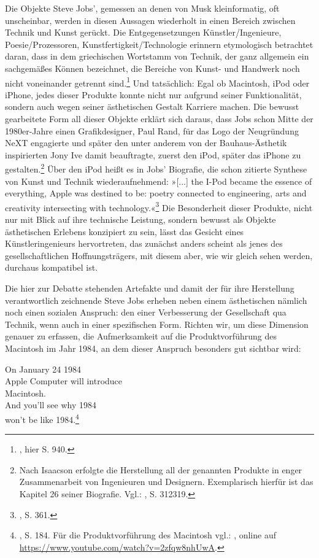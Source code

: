 \documentclass[%
	fontsize=10pt,%
	twoside,%
	headings=optiontoheadandtoc,%
	showtrims]{scrbook}
\renewenvironment{quote}{%
  \addmargin[\genericindent]{0pt}%
  \KOMAoptions{parskip=true}%
  \ifdim\parskip>0pt\else\addvspace{\intextsep}\fi
}{%
  \par
  \endaddmargin\vspace{\intextsep}
}
\begin{document}
\par Die Objekte Steve Jobs\textquoteright{}, gemessen an denen von Musk kleinformatig, oft unscheinbar, werden in diesen Aussagen wiederholt in einen Bereich zwischen Technik und Kunst gerückt. Die Entgegensetzungen Künstler/Ingenieure, Poesie/Prozessoren, Kunstfertigkeit/Technologie erinnern etymologisch betrachtet daran, dass in dem griechischen Wortstamm von Technik, der ganz allgemein ein sachgemäßes Können bezeichnet, die Bereiche von Kunst- und Handwerk noch nicht voneinander getrennt sind.\footnote{\cite[][]{technik1998a}, hier S. 940.}  Und tatsächlich: Egal ob Macintosh, iPod oder iPhone, jedes dieser Produkte konnte nicht nur aufgrund seiner Funktionalität, sondern auch wegen seiner ästhetischen Gestalt Karriere machen. Die bewusst gearbeitete Form all dieser Objekte erklärt sich daraus, dass Jobs schon Mitte der 1980er-Jahre einen Grafikdesigner, Paul Rand, für das Logo der Neugründung NeXT engagierte und später den unter anderem von der Bauhaus-Ästhetik inspirierten Jony Ive damit beauftragte, zuerst den iPod, später das iPhone zu gestalten.\footnote{Nach Isaacson erfolgte die Herstellung all der genannten Produkte in enger Zusammenarbeit von Ingenieuren und Designern. Exemplarisch hierfür ist das Kapitel 26 seiner Biografie. Vgl.: \cite[][]{isaacson2011a}, S. 312\textendash{}319.}  Über den iPod heißt es in Jobs\textquoteright{} Biografie, die schon zitierte Synthese von Kunst und Technik wiederaufnehmend: »{[}...{]} the I-Pod became the essence of everything, Apple was destined to be: poetry connected to engineering, arts and creativity intersecting with technology.«\footnote{\cite[][]{isaacson2011a}, S. 361.}  Die Besonderheit dieser Produkte, nicht nur mit Blick auf ihre technische Leistung, sondern bewusst als Objekte ästhetischen Erlebens konzipiert zu sein, lässt das Gesicht eines Künstleringenieurs hervortreten, das zunächst anders scheint als jenes des gesellschaftlichen Hoffnungsträgers, mit diesem aber, wie wir gleich sehen werden, durchaus kompatibel ist.\par Die hier zur Debatte stehenden Artefakte und damit der für ihre Herstellung verantwortlich zeichnende Steve Jobs erheben neben einem ästhetischen nämlich noch einen sozialen Anspruch: den einer Verbesserung der Gesellschaft qua Technik, wenn auch in einer spezifischen Form. Richten wir, um diese Dimension genauer zu erfassen, die Aufmerksamkeit auf die Produktvorführung des Macintosh im Jahr 1984, an dem dieser Anspruch besonders gut sichtbar wird:\begin{quote}
\par On January 24 1984\- \protect\\  Apple Computer will introduce\- \protect\\  Macintosh.\- \protect\\  And you\textquoteright{}ll see why 1984\- \protect\\  won\textquoteright{}t be like 1984.\footnote{\cite[][]{isaacson2011a}, S. 184. Für die Produktvorführung des Macintosh vgl.: \cite[][]{apple1984a}, online auf \url{https://www.youtube.com/watch?v=2zfqw8nhUwA}.} 
\end{quote}
\end{document}
